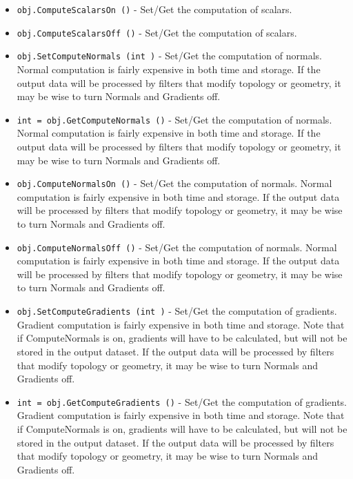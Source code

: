 \begin{itemize}
\item  \verb|obj.ComputeScalarsOn ()| -  Set/Get the computation of scalars.

\item  \verb|obj.ComputeScalarsOff ()| -  Set/Get the computation of scalars.

\item  \verb|obj.SetComputeNormals (int )| -  Set/Get the computation of normals. Normal computation is fairly expensive
 in both time and storage. If the output data will be processed by filters
 that modify topology or geometry, it may be wise to turn Normals and Gradients off.

\item  \verb|int = obj.GetComputeNormals ()| -  Set/Get the computation of normals. Normal computation is fairly expensive
 in both time and storage. If the output data will be processed by filters
 that modify topology or geometry, it may be wise to turn Normals and Gradients off.

\item  \verb|obj.ComputeNormalsOn ()| -  Set/Get the computation of normals. Normal computation is fairly expensive
 in both time and storage. If the output data will be processed by filters
 that modify topology or geometry, it may be wise to turn Normals and Gradients off.

\item  \verb|obj.ComputeNormalsOff ()| -  Set/Get the computation of normals. Normal computation is fairly expensive
 in both time and storage. If the output data will be processed by filters
 that modify topology or geometry, it may be wise to turn Normals and Gradients off.

\item  \verb|obj.SetComputeGradients (int )| -  Set/Get the computation of gradients. Gradient computation is fairly expensive
 in both time and storage. Note that if ComputeNormals is on, gradients will
 have to be calculated, but will not be stored in the output dataset.
 If the output data will be processed by filters that modify topology or
 geometry, it may be wise to turn Normals and Gradients off.

\item  \verb|int = obj.GetComputeGradients ()| -  Set/Get the computation of gradients. Gradient computation is fairly expensive
 in both time and storage. Note that if ComputeNormals is on, gradients will
 have to be calculated, but will not be stored in the output dataset.
 If the output data will be processed by filters that modify topology or
 geometry, it may be wise to turn Normals and Gradients off.


\end{itemize}
